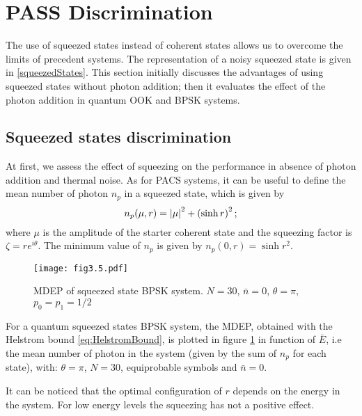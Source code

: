 \section{PASS Discrimination}
    The use of squeezed states instead of coherent states allows us to overcome the limits
    of precedent systems. The representation of a noisy squeezed state is given in 
    \ref{squeezedStates}. This section initially discusses the advantages of using squeezed states 
    without photon addition; then it evaluates the effect of the photon addition
    in quantum OOK and BPSK systems.

    \subsection{Squeezed states discrimination}
        At first, we assess the effect of squeezing on the performance in absence of photon 
        addition and thermal noise. As for PACS systems, it can be useful to define the mean 
        number of photon $n_p$ in a squeezed state, which is given by
        \begin{equation}
            n_p(\mu,r) = \absolutevalue{\mu}^2 + \left(\sinh{r}\right)^2;
        \end{equation}
        where $\mu$ is the amplitude of the starter coherent state and the squeezing factor
        is $\zeta = r e^{i\theta}$. The minimum value of $n_p$ is given by $n_p(0,r) = \sinh{r}^2$.

        \begin{figure}[tbp]
            \begin{center}
                \texttt{[image: fig3.5.pdf]}
                \caption{MDEP of squeezed state BPSK system. 
                    $N=30$, $\bar{n}=0$, $\theta=\pi$, $p_0=p_1=1/2$}
                \label{fig:3.5}
            \end{center}     
        \end{figure}
        For a quantum squeezed states BPSK system, the MDEP, obtained with the Helstrom bound 
        \ref{eq:HelstromBound}, is plotted in figure \ref{fig:3.5} in function of $\bar{E}$,
        i.e the mean number of photon in the system (given by the sum of $n_p$ for each state), with:
        $\theta=\pi$, $N=30$, equiprobable symbols and $\bar{n}=0$.

        It can be noticed that the optimal configuration of $r$ depends on the energy in the 
        system. For low energy levels the squeezing has not a positive effect.

